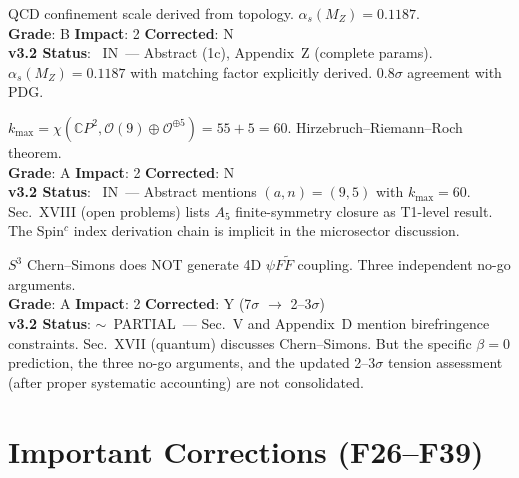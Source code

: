 \documentclass[11pt,a4paper]{article}
\newcommand{\vin}{\textcolor{statusIN}{\checkmark~IN}}
\newcommand{\vpartial}{\textcolor{statusPARTIAL}{$\sim$~PARTIAL}}
\begin{document}
\begin{tcolorbox}[colback=major!5,colframe=major,title=\textbf{F23: $\Lambda_{\rm QCD}$ from $\alpha$: $M_P \alpha^{19/2} = 61.20$~MeV}]
QCD confinement scale derived from topology. $\alpha_s(M_Z) = 0.1187$.\\
\textbf{Grade}: B \quad \textbf{Impact}: 2 \quad \textbf{Corrected}: N\\
\textbf{v3.2 Status}: \vin\ --- Abstract (1c), Appendix~Z (complete params). $\alpha_s(M_Z) = 0.1187$ with matching factor explicitly derived. $0.8\sigma$ agreement with PDG.
\end{tcolorbox}

\begin{tcolorbox}[colback=major!5,colframe=major,title=\textbf{F24: $k_{\max} = 60$ from Spin$^c$ Index (Theorem)}]
$k_{\max} = \chi(\mathbb{C}P^2, \mathcal{O}(9) \oplus \mathcal{O}^{\oplus 5}) = 55 + 5 = 60$. Hirzebruch--Riemann--Roch theorem.\\
\textbf{Grade}: A \quad \textbf{Impact}: 2 \quad \textbf{Corrected}: N\\
\textbf{v3.2 Status}: \vin\ --- Abstract mentions $(a,n) = (9,5)$ with $k_{\max} = 60$. Sec.~XVIII (open problems) lists $A_5$ finite-symmetry closure as T1-level result. The Spin$^c$ index derivation chain is implicit in the microsector discussion.
\end{tcolorbox}

\begin{tcolorbox}[colback=major!5,colframe=major,title=\textbf{F25: $\beta = 0$ Cosmic Birefringence Null (Theorem-Grade)}]
$S^3$ Chern--Simons does NOT generate 4D $\psi F\tilde{F}$ coupling. Three independent no-go arguments.\\
\textbf{Grade}: A \quad \textbf{Impact}: 2 \quad \textbf{Corrected}: Y (7$\sigma$ $\to$ 2--3$\sigma$)\\
\textbf{v3.2 Status}: \vpartial\ --- Sec.~V and Appendix~D mention birefringence constraints. Sec.~XVII (quantum) discusses Chern--Simons. But the specific $\beta = 0$ prediction, the three no-go arguments, and the updated 2--3$\sigma$ tension assessment (after proper systematic accounting) are not consolidated.
\end{tcolorbox}


\section{Important Corrections (F26--F39)}\label{sec:corrections}
\end{document}
